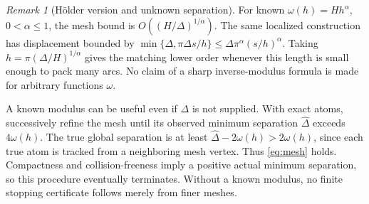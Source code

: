\documentclass[11pt]{article}
\theoremstyle{remark}\newtheorem{remark}[theorem]{Remark}
\begin{document}
\begin{remark}[H\"older version and unknown separation]
For known $\omega(h)=Hh^\alpha$, $0<\alpha\leq1$, the mesh bound is $O((H/\Delta)^{1/\alpha})$. The same localized construction has displacement bounded by $\min\{\Delta,\pi\Delta s/h\}\leq\Delta\pi^\alpha(s/h)^\alpha$. Taking $h=\pi(\Delta/H)^{1/\alpha}$ gives the matching lower order whenever this length is small enough to pack many arcs. No claim of a sharp inverse-modulus formula is made for arbitrary functions $\omega$.

A known modulus can be useful even if $\Delta$ is not supplied. With exact atoms, successively refine the mesh until its observed minimum separation $\widehat\Delta$ exceeds $4\omega(h)$. The true global separation is at least $\widehat\Delta-2\omega(h)>2\omega(h)$, since each true atom is tracked from a neighboring mesh vertex. Thus \eqref{eq:mesh} holds. Compactness and collision-freeness imply a positive actual minimum separation, so this procedure eventually terminates. Without a known modulus, no finite stopping certificate follows merely from finer meshes.
\end{remark}
\end{document}
